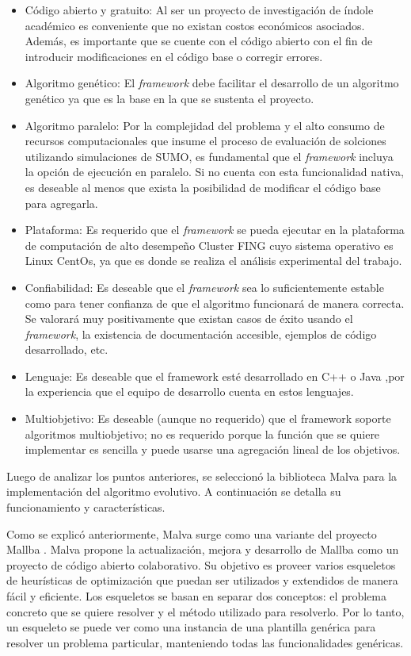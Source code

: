 \begin{itemize}
	\item Código abierto y gratuito: Al ser un proyecto de investigación de índole académico es conveniente que no existan costos económicos asociados. Además, es importante que se cuente con el código abierto con el fin de introducir modificaciones en el código base o corregir errores.
	\item Algoritmo genético: El \emph{framework} debe facilitar el desarrollo de un algoritmo genético ya que es la base en la que se sustenta el proyecto.
	\item Algoritmo paralelo: Por la complejidad del problema y el alto consumo de recursos computacionales que insume el proceso de evaluación de solciones utilizando simulaciones de SUMO, es fundamental que el \emph{framework} incluya la opción de ejecución en paralelo. Si no cuenta con esta funcionalidad nativa, es deseable al menos que exista la posibilidad de modificar el código base para agregarla.
	\item Plataforma: Es requerido que el \emph{framework} se pueda ejecutar en la plataforma de computación de alto desempeño Cluster FING cuyo sistema operativo es Linux CentOs, ya que es donde se realiza el análisis experimental del trabajo. 
	\item Confiabilidad: Es deseable que el \emph{framework} sea lo suficientemente estable como para tener confianza de que el algoritmo funcionará de manera correcta. Se valorará muy positivamente que existan casos de éxito usando el \emph{framework}, la existencia de documentación accesible, ejemplos de código desarrollado, etc.
	\item Lenguaje: Es deseable que el framework esté desarrollado en C++ o Java ,por la experiencia que el equipo de desarrollo cuenta en estos lenguajes. 
	\item Multiobjetivo: Es deseable (aunque no requerido) que el framework soporte algoritmos multiobjetivo; no es requerido porque la función que se quiere implementar es sencilla y puede usarse una agregación lineal de los objetivos.
\end{itemize} 

Luego de analizar los puntos anteriores, se seleccionó la biblioteca Malva para la implementación del algoritmo evolutivo. A continuación se detalla su funcionamiento y características.

Como se explicó anteriormente, Malva \citep {Malva} surge como una variante del proyecto Mallba \citep{Mallba}. Malva propone la actualización, mejora y desarrollo de Mallba como un proyecto de código abierto colaborativo.  Su objetivo es proveer varios esqueletos de heurísticas de optimización que puedan ser utilizados y extendidos de manera fácil y eficiente. Los esqueletos se basan en separar dos conceptos: el problema concreto que se quiere resolver y el método utilizado para resolverlo. Por lo tanto, un esqueleto se puede ver como una instancia de una plantilla genérica para resolver un problema particular, manteniendo todas las funcionalidades genéricas.

